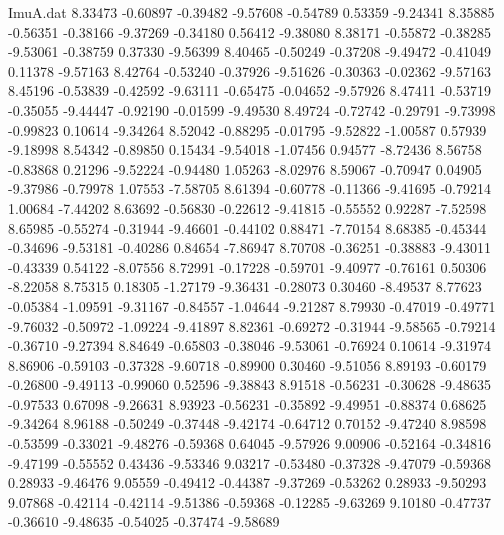 \begin{filecontents}{ImuA.dat}
   8.33473   -0.60897   -0.39482   -9.57608   -0.54789    0.53359   -9.24341
   8.35885   -0.56351   -0.38166   -9.37269   -0.34180    0.56412   -9.38080
   8.38171   -0.55872   -0.38285   -9.53061   -0.38759    0.37330   -9.56399
   8.40465   -0.50249   -0.37208   -9.49472   -0.41049    0.11378   -9.57163
   8.42764   -0.53240   -0.37926   -9.51626   -0.30363   -0.02362   -9.57163
   8.45196   -0.53839   -0.42592   -9.63111   -0.65475   -0.04652   -9.57926
   8.47411   -0.53719   -0.35055   -9.44447   -0.92190   -0.01599   -9.49530
   8.49724   -0.72742   -0.29791   -9.73998   -0.99823    0.10614   -9.34264
   8.52042   -0.88295   -0.01795   -9.52822   -1.00587    0.57939   -9.18998
   8.54342   -0.89850    0.15434   -9.54018   -1.07456    0.94577   -8.72436
   8.56758   -0.83868    0.21296   -9.52224   -0.94480    1.05263   -8.02976
   8.59067   -0.70947    0.04905   -9.37986   -0.79978    1.07553   -7.58705
   8.61394   -0.60778   -0.11366   -9.41695   -0.79214    1.00684   -7.44202
   8.63692   -0.56830   -0.22612   -9.41815   -0.55552    0.92287   -7.52598
   8.65985   -0.55274   -0.31944   -9.46601   -0.44102    0.88471   -7.70154
   8.68385   -0.45344   -0.34696   -9.53181   -0.40286    0.84654   -7.86947
   8.70708   -0.36251   -0.38883   -9.43011   -0.43339    0.54122   -8.07556
   8.72991   -0.17228   -0.59701   -9.40977   -0.76161    0.50306   -8.22058
   8.75315    0.18305   -1.27179   -9.36431   -0.28073    0.30460   -8.49537
   8.77623   -0.05384   -1.09591   -9.31167   -0.84557   -1.04644   -9.21287
   8.79930   -0.47019   -0.49771   -9.76032   -0.50972   -1.09224   -9.41897
   8.82361   -0.69272   -0.31944   -9.58565   -0.79214   -0.36710   -9.27394
   8.84649   -0.65803   -0.38046   -9.53061   -0.76924    0.10614   -9.31974
   8.86906   -0.59103   -0.37328   -9.60718   -0.89900    0.30460   -9.51056
   8.89193   -0.60179   -0.26800   -9.49113   -0.99060    0.52596   -9.38843
   8.91518   -0.56231   -0.30628   -9.48635   -0.97533    0.67098   -9.26631
   8.93923   -0.56231   -0.35892   -9.49951   -0.88374    0.68625   -9.34264
   8.96188   -0.50249   -0.37448   -9.42174   -0.64712    0.70152   -9.47240
   8.98598   -0.53599   -0.33021   -9.48276   -0.59368    0.64045   -9.57926
   9.00906   -0.52164   -0.34816   -9.47199   -0.55552    0.43436   -9.53346
   9.03217   -0.53480   -0.37328   -9.47079   -0.59368    0.28933   -9.46476
   9.05559   -0.49412   -0.44387   -9.37269   -0.53262    0.28933   -9.50293
   9.07868   -0.42114   -0.42114   -9.51386   -0.59368   -0.12285   -9.63269
   9.10180   -0.47737   -0.36610   -9.48635   -0.54025   -0.37474   -9.58689

\end{filecontents}
